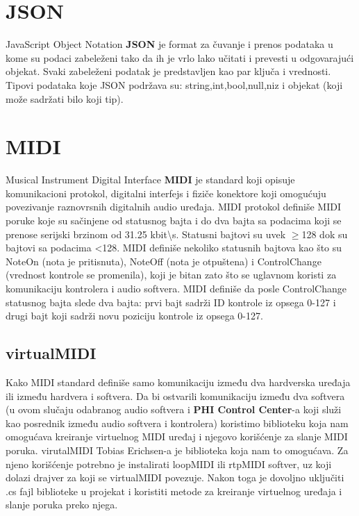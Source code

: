 \documentclass[12pt,oneside]{memoir}
\begin{document}
	\section{JSON}
	JavaScript Object Notation \textbf{JSON} je format za čuvanje i prenos podataka u kome su podaci zabeleženi tako da ih je vrlo lako učitati i prevesti u odgovarajući objekat. Svaki zabeleženi podatak je predstavljen kao par ključa i vrednosti. Tipovi podataka koje JSON podržava su: string,int,bool,null,niz i objekat (koji može sadržati bilo koji tip).
	\section{MIDI}
	Musical Instrument Digital Interface \textbf{MIDI} je standard koji opisuje komunikacioni protokol, digitalni interfejs i fiziče konektore koji omogućuju povezivanje raznovrsnih digitalnih audio uređaja. MIDI protokol definiše MIDI poruke koje su sačinjene od statusnog bajta i do dva bajta sa podacima koji se prenose serijski brzinom od 31.25 kbit\textbackslash s. Statusni bajtovi su uvek $\geq$128 dok su bajtovi sa podacima <128. MIDI definiše nekoliko statusnih bajtova kao što su NoteOn (nota je pritisnuta), NoteOff (nota je otpuštena) i ControlChange (vrednost kontrole se promenila), koji je bitan zato što se uglavnom koristi za komunikaciju kontrolera i audio softvera. MIDI definiše da posle ControlChange statusnog bajta slede dva bajta: prvi bajt sadrži ID kontrole iz opsega 0-127 i drugi bajt koji sadrži novu poziciju kontrole iz opsega 0-127.
	\subsection{virtualMIDI}
	Kako MIDI standard definiše samo komunikaciju između dva hardverska uređaja ili između hardvera i softvera. Da bi ostvarili komunikaciju između dva softvera (u ovom slučaju odabranog audio softvera i \textbf{PHI Control Center}-a koji služi kao posrednik između audio softvera i kontrolera) koristimo biblioteku koja nam omogućava kreiranje virtuelnog MIDI uređaj i njegovo korišćenje za slanje MIDI poruka.
	virutalMIDI Tobias Erichsen-a je biblioteka koja nam to omogućava. Za njeno korišćenje potrebno je instalirati loopMIDI ili rtpMIDI softver, uz koji dolazi drajver za koji se virtualMIDI povezuje. Nakon toga je dovoljno uključiti .cs fajl biblioteke u projekat i koristiti metode za kreiranje virtuelnog uređaja i slanje poruka preko njega.
\end{document}
